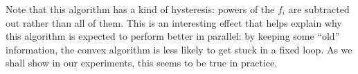 \documentclass[times, 10pt,twocolumn]{article}
\begin{document}
Note that this algorithm has a kind of hysteresis: powers of the
$f_i$ are subtracted out rather than all of them. This is an
interesting effect that helps explain why this algorithm is
expected to perform better in parallel: by keeping some ``old''
information, the convex algorithm is less likely to get stuck
in a fixed loop. As we shall show in our experiments, this seems to
be true in practice.


\begin{figure}[h!]\centering

\end{figure}
\end{document}
